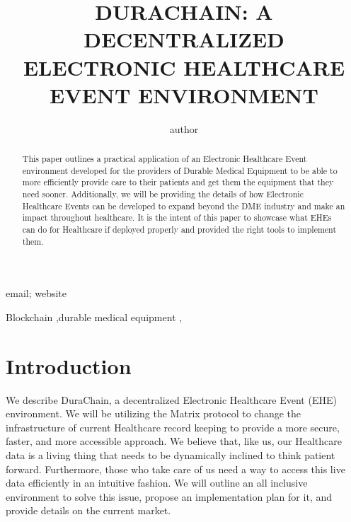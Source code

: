 \documentclass[12pt]{article}
\begin{document}
\begin{frontmatter}

\title{DURACHAIN: A DECENTRALIZED ELECTRONIC HEALTHCARE EVENT ENVIRONMENT}

\author{author}

email; website

\begin{abstract}
This paper outlines a practical application of an Electronic Healthcare Event environment developed for the providers of Durable Medical Equipment to be able to more efficiently provide care to their patients and get them the equipment that they need sooner. Additionally, we will be providing the details of how Electronic Healthcare Events can be developed to expand beyond the DME industry and make an impact throughout healthcare. It is the intent of this paper to showcase what EHEs can do for Healthcare if deployed properly and provided the right tools to implement them.
\end{abstract}

\begin{keyword}
Blockchain \sep durable medical equipment \sep
\end{keyword}

\end{frontmatter}


\section{Introduction}
We describe DuraChain, a decentralized Electronic Healthcare Event (EHE) environment. We will be utilizing the Matrix protocol to change the infrastructure of current Healthcare record keeping to provide a more secure, faster, and more accessible approach. We believe that, like us, our Healthcare data is a living thing that needs to be dynamically inclined to think patient forward. Furthermore, those who take care of us need a way to access this live data efficiently in an intuitive fashion. We will outline an all inclusive environment to solve this issue, propose an implementation plan for it, and provide details on the current market.
\end{document}
